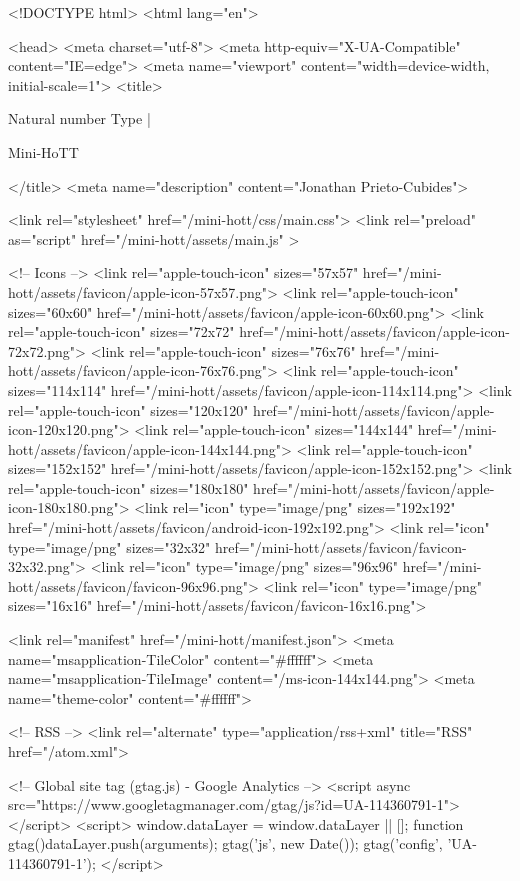 <!DOCTYPE html>
<html lang="en">

<head>
  <meta charset="utf-8">
  <meta http-equiv="X-UA-Compatible" content="IE=edge">
  <meta name="viewport" content="width=device-width, initial-scale=1">
  <title>
    
      
        Natural number Type |
      
        Mini-HoTT
    
  </title>
  <meta name="description" content="Jonathan Prieto-Cubides">

  <link rel="stylesheet" href="/mini-hott/css/main.css">
  <link rel="preload" as="script" href="/mini-hott/assets/main.js" >

  <!-- Icons -->
  <link rel="apple-touch-icon" sizes="57x57" href="/mini-hott/assets/favicon/apple-icon-57x57.png">
  <link rel="apple-touch-icon" sizes="60x60" href="/mini-hott/assets/favicon/apple-icon-60x60.png">
  <link rel="apple-touch-icon" sizes="72x72" href="/mini-hott/assets/favicon/apple-icon-72x72.png">
  <link rel="apple-touch-icon" sizes="76x76" href="/mini-hott/assets/favicon/apple-icon-76x76.png">
  <link rel="apple-touch-icon" sizes="114x114" href="/mini-hott/assets/favicon/apple-icon-114x114.png">
  <link rel="apple-touch-icon" sizes="120x120" href="/mini-hott/assets/favicon/apple-icon-120x120.png">
  <link rel="apple-touch-icon" sizes="144x144" href="/mini-hott/assets/favicon/apple-icon-144x144.png">
  <link rel="apple-touch-icon" sizes="152x152" href="/mini-hott/assets/favicon/apple-icon-152x152.png">
  <link rel="apple-touch-icon" sizes="180x180" href="/mini-hott/assets/favicon/apple-icon-180x180.png">
  <link rel="icon" type="image/png" sizes="192x192"  href="/mini-hott/assets/favicon/android-icon-192x192.png">
  <link rel="icon" type="image/png" sizes="32x32" href="/mini-hott/assets/favicon/favicon-32x32.png">
  <link rel="icon" type="image/png" sizes="96x96" href="/mini-hott/assets/favicon/favicon-96x96.png">
  <link rel="icon" type="image/png" sizes="16x16" href="/mini-hott/assets/favicon/favicon-16x16.png">

  <link rel="manifest" href="/mini-hott/manifest.json">
  <meta name="msapplication-TileColor" content="#ffffff">
  <meta name="msapplication-TileImage" content="/ms-icon-144x144.png">
  <meta name="theme-color" content="#ffffff">

  <!-- RSS -->
  <link rel="alternate" type="application/rss+xml" title="RSS" href="/atom.xml">

  <!-- Global site tag (gtag.js) - Google Analytics -->
  <script async src="https://www.googletagmanager.com/gtag/js?id=UA-114360791-1"></script>
  <script>
    window.dataLayer = window.dataLayer || [];
    function gtag(){dataLayer.push(arguments);}
    gtag('js', new Date());
    gtag('config', 'UA-114360791-1');
  </script>

